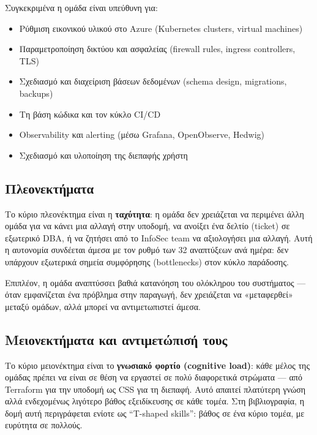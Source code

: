 \documentclass[11pt,a4paper,greek,twoside]{template-xe}
\providecommand{\tightlist}{\setlength{\itemsep}{0pt}\setlength{\parskip}{0pt}}
\begin{document}
Συγκεκριμένα η ομάδα είναι υπεύθυνη για:

\begin{itemize}
\tightlist
\item
  Ρύθμιση εικονικού υλικού στο Azure (Kubernetes clusters, virtual
  machines)
\item
  Παραμετροποίηση δικτύου και ασφαλείας (firewall rules, ingress
  controllers, TLS)
\item
  Σχεδιασμό και διαχείριση βάσεων δεδομένων (schema design, migrations,
  backups)
\item
  Τη βάση κώδικα και τον κύκλο CI/CD
\item
  Observability και alerting (μέσω Grafana, OpenObserve, Hedwig)
\item
  Σχεδιασμό και υλοποίηση της διεπαφής χρήστη
\end{itemize}

\subsection{Πλεονεκτήματα}\label{ux3c0ux3bbux3b5ux3bfux3bdux3b5ux3baux3c4ux3aeux3bcux3b1ux3c4ux3b1}

Το κύριο πλεονέκτημα είναι η \textbf{ταχύτητα}: η ομάδα δεν χρειάζεται
να περιμένει άλλη ομάδα για να κάνει μια αλλαγή στην υποδομή, να ανοίξει
ένα δελτίο (ticket) σε εξωτερικό DBA, ή να ζητήσει από το InfoSec team
να αξιολογήσει μια αλλαγή. Αυτή η αυτονομία συνδέεται άμεσα με τον ρυθμό
των 32 αναπτύξεων ανά ημέρα: δεν υπάρχουν εξωτερικά σημεία συμφόρησης
(bottlenecks) στον κύκλο παράδοσης.

Επιπλέον, η ομάδα αναπτύσσει βαθιά κατανόηση του ολόκληρου του
συστήματος --- όταν εμφανίζεται ένα πρόβλημα στην παραγωγή, δεν
χρειάζεται να «μεταφερθεί» μεταξύ ομάδων, αλλά μπορεί να αντιμετωπιστεί
άμεσα.

\subsection{Μειονεκτήματα και αντιμετώπισή
τους}\label{ux3bcux3b5ux3b9ux3bfux3bdux3b5ux3baux3c4ux3aeux3bcux3b1ux3c4ux3b1-ux3baux3b1ux3b9-ux3b1ux3bdux3c4ux3b9ux3bcux3b5ux3c4ux3ceux3c0ux3b9ux3c3ux3ae-ux3c4ux3bfux3c5ux3c2}

Το κύριο μειονέκτημα είναι το \textbf{γνωσιακό φορτίο (cognitive load)}:
κάθε μέλος της ομάδας πρέπει να είναι σε θέση να εργαστεί σε πολύ
διαφορετικά στρώματα --- από Terraform για την υποδομή ως CSS για τη
διεπαφή. Αυτό απαιτεί πλατύτερη γνώση αλλά ενδεχομένως λιγότερο βάθος
εξειδίκευσης σε κάθε τομέα. Στη βιβλιογραφία, η δομή αυτή περιγράφεται
ενίοτε ως ``T-shaped skills'': βάθος σε ένα κύριο τομέα, με ευρύτητα σε
πολλούς.
\end{document}
